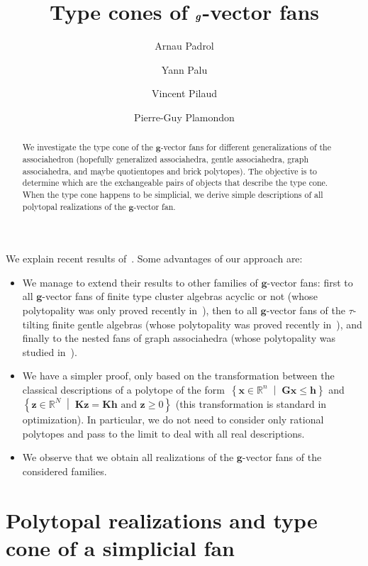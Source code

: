 \documentclass{amsart}
\title{Type cones of $\b{g}$-vector fans}
\author{Arnau Padrol}
\author{Yann Palu}
\author{Vincent Pilaud}
\author{Pierre-Guy Plamondon}
\theoremstyle{definition}
\newcommand{\R}{\mathbb{R}} %
\renewcommand{\b}[1]{{\boldsymbol{#1}}} %
\newcommand{\set}[2]{\left\{ #1 \;\middle|\; #2 \right\}} %
\begin{document}
\begin{abstract}
We investigate the type cone of the $\b{g}$-vector fans for different generalizations of the associahedron (hopefully generalized associahedra, gentle associahedra, graph associahedra, and maybe quotientopes and brick polytopes).
The objective is to determine which are the exchangeable pairs of objects that describe the type cone.
When the type cone happens to be simplicial, we derive simple descriptions of all polytopal realizations of the $\b{g}$-vector fan.
\end{abstract}

\maketitle

We explain recent results of~\cite{BazierMatteDouvilleMousavandThomasYildirim}. Some advantages of our approach are:
\begin{itemize}
\item We manage to extend their results to other families of $\b{g}$-vector fans: first to all $\b{g}$-vector fans of finite type cluster algebras acyclic or not (whose polytopality was only proved recently in~\cite{HohlwegPilaudStella}), then to all $\b{g}$-vector fans of the $\tau$-tilting finite gentle algebras (whose polytopality was proved recently in~\cite{PaluPilaudPlamondon-nonkissing}), and finally to the nested fans of graph associahedra (whose polytopality was studied in~\cite{CarrDevadoss, Devadoss, Postnikov, FeichtnerSturmfels, Zelevinsky}).
\item We have a simpler proof, only based on the transformation between the classical descriptions of a polytope of the form~$\set{\b{x} \in \R^n}{\b{G}\b{x} \le \b{h}}$ and~$\set{\b{z} \in \R^N}{\b{K}\b{z} = \b{K}\b{h} \text{ and } \b{z} \ge 0}$ (this transformation is standard in optimization). In particular, we do not need to consider only rational polytopes and pass to the limit to deal with all real descriptions.
\item We observe that we obtain all realizations of the $\b{g}$-vector fans of the considered families.
\end{itemize}


\section{Polytopal realizations and type cone of a simplicial fan}
\end{document}
